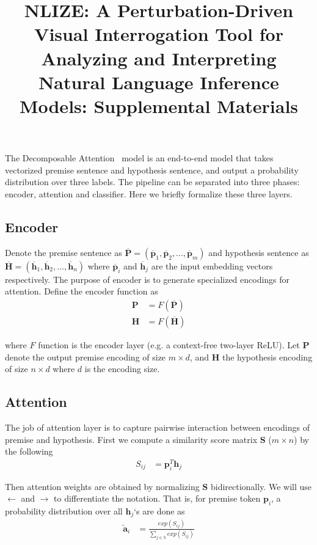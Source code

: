 \documentclass[review,journal]{vgtc}         %
\title{
NLIZE: A Perturbation-Driven Visual Interrogation Tool for Analyzing and Interpreting Natural Language Inference Models: Supplemental Materials
}
\begin{document}
\maketitle

The Decomposable Attention~\cite{parikh2016emnlp} model is an end-to-end model that takes vectorized premise sentence and hypothesis sentence, and output a probability distribution over three labels. The pipeline can be separated into three phases: encoder, attention and classifier. Here we briefly formalize these three layers.

\subsection{Encoder}
Denote the premise sentence as $\overline{\boldsymbol{P}} = (\overline{\boldsymbol{p}}_1, \overline{\boldsymbol{p}}_2, ..., \overline{\boldsymbol{p}}_m)$ and hypothesis sentence as $\overline{\boldsymbol{H}} = (\overline{\boldsymbol{h}}_1, \overline{\boldsymbol{h}}_2, ..., \overline{\boldsymbol{h}}_n)$ where $\overline{\boldsymbol{p}}_i$ and $\overline{\boldsymbol{h}}_j$ are the input embedding vectors respectively. The purpose of encoder is to generate specialized encodings for attention. Define the encoder function as
\begin{align}
  \boldsymbol{P} &= F(\overline{\boldsymbol{P}})\\
  \boldsymbol{H} &= F(\overline{\boldsymbol{H}})
\end{align}

where $F$ function is the encoder layer (e.g. a context-free two-layer ReLU). Let $\boldsymbol{P}$ denote the output premise encoding of size $m \times d$, and $\boldsymbol{H}$ the hypothesis encoding of size $n \times d$ where $d$ is the encoding size.

\subsection{Attention} \label{sec:att}
The job of attention layer is to capture pairwise interaction between encodings of premise and hypothesis. First we compute a similarity score matrix $\boldsymbol{S}$ ($m \times n$) by the following
\begin{align}
  S_{ij} &= \boldsymbol{p}_i ^T \boldsymbol{h}_j
\end{align}

Then attention weights are obtained by normalizing $\boldsymbol{S}$ bidirectionally. We will use $\leftarrow$ and $\rightarrow$ to differentiate the notation. That is, for premise token $\boldsymbol{p}_i$, a probability distribution over all $\boldsymbol{h}_j$`s are done as
\begin{align}
  \overleftarrow{\boldsymbol{a}}_i &= \frac{exp(S_{ij})}{\sum_{j \in h} exp(S_{ij})}
\end{align}
\end{document}
